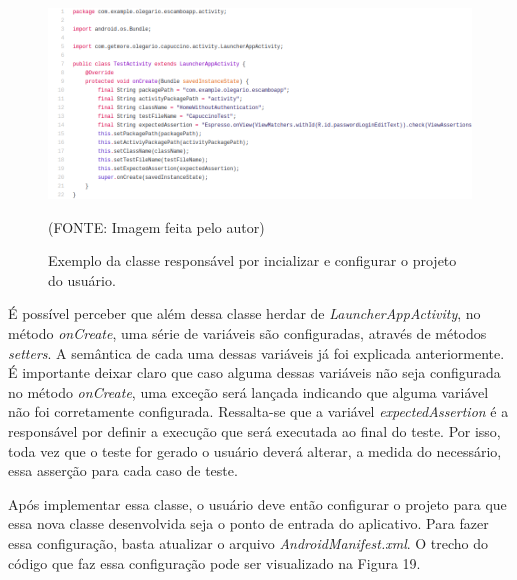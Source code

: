 \documentclass[
    12pt,       %
    openright,      %
    twoside,      %
    a4paper,      %
    english,      %
    french,       %
    spanish,      %
    brazil,       %
    ]{abntex2}
\begin{document}
        \begin{figure}[htbp]
          \begin{center}
            \includegraphics[width=1.0\textwidth]{img/testActivity.png}
              \end{center}
            \caption{\label{fig:passaro} Exemplo da classe responsável por incializar e configurar o projeto do usuário.}
          \begin{center}(FONTE: Imagem feita pelo autor)\end{center}
        \end{figure}

        É possível perceber que além dessa classe herdar de \textit{LauncherAppActivity}, no método
        \textit{onCreate}, uma série de variáveis são configuradas, através de métodos \textit{setters}.
        A semântica de cada uma dessas variáveis já foi explicada anteriormente. É importante deixar
        claro que caso alguma dessas variáveis não seja configurada no método \textit{onCreate}, uma exceção
        será lançada indicando que alguma variável não foi corretamente configurada. Ressalta-se que a
        variável \textit{expectedAssertion} é a responsável por definir a execução que será executada
        ao final do teste. Por isso, toda vez que o teste for gerado o usuário deverá alterar, a medida
        do necessário, essa asserção para cada caso de teste.

        Após implementar essa classe, o usuário deve então configurar o projeto para que essa nova classe
        desenvolvida seja o ponto de entrada do aplicativo. Para fazer essa configuração, basta atualizar
        o arquivo \textit{AndroidManifest.xml}. O trecho do código que faz essa configuração pode ser
        visualizado na Figura 19.
\end{document}
